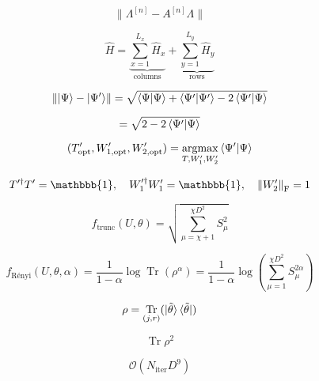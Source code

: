 \documentclass{article}
\DeclareMathOperator{\Tr}{Tr}
\let\Re\relax
\DeclareMathOperator{\Re}{Re}
\DeclareMathOperator{\argmax}{argmax}
\newcommand{\id}{\mathbbb{1}}
\begin{document}
	\begin{equation}
	\lVert \Lambda^{[n]} - A^{[n]} \Lambda\rVert
	\end{equation}
	
	\begin{equation}
	\hat{H} = \underbrace{\sum_{x=1}^{L_x}\hat{H}_x}_{\text{columns}} + \underbrace{\sum_{y=1}^{L_y}\hat{H}_y}_{\text{rows}}
	\end{equation}
	
	\begin{equation}
	\lVert\ket{\Psi}-\ket{\Psi^\prime}\rVert = \sqrt{\braket{\Psi|\Psi}+\braket{\Psi^\prime|\Psi^\prime}-2\braket{\Psi^\prime|\Psi}}
	\end{equation}
	
	\begin{equation}
	= \sqrt{2-2\Re\braket{\Psi^\prime|\Psi}}
	\end{equation}
	
	\begin{equation}
			(T_\text{opt}^\prime, W_{1,\text{opt}}^\prime, W_{2,\text{opt}}^\prime) = \underset{T,W_1^\prime,W_2^\prime}{\argmax}\Re\braket{\Psi^\prime|\Psi}
	\end{equation}
	
	\begin{equation}
		T^{\prime\dagger}T^\prime = \id, \quad W_1^{\prime\dagger}W_1^\prime = \id, \quad \left\lVert W_2^\prime \right\rVert_\text{F} = 1
	\end{equation}
	
	\begin{equation}
		f_\text{trunc}\left(U,\theta\right) = \sqrt{\sum_{\mu = \chi+1}^{\chi D^2}S_\mu^2}
	\end{equation}
	
	\begin{equation}
		f_\text{Rényi}\left(U,\theta,\alpha\right) = \frac{1}{1-\alpha}\log\Tr\left(\rho^\alpha\right) = \frac{1}{1-\alpha}\log\left(\sum_{\mu=1}^{\chi D^2}S_\mu^{2\alpha}\right)
	\end{equation}
	
	\begin{equation}
		\rho = \Tr_{(j, r)}(\ket{\tilde{\theta}}\bra{\tilde{\theta}})
	\end{equation}
	
	\begin{equation}
		\Tr\rho^2
	\end{equation}
	
	\begin{equation}
		\mathcal{O}(N_\text{iter}D^9)
	\end{equation}
	
\end{document}
